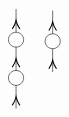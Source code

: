 \begin{equation}
\begin{tikzpicture}[x=0.55pt,y=0.55pt,yscale=-1,xscale=1]
\draw    (220.5,57.72) -- (220.5,27.4) ;
\draw [shift={(220.5,42.56)}, rotate = 450] [color={rgb, 255:red, 0; green, 0; blue, 0 }  ][line width=0.75]    (10.93,-4.9) .. controls (6.95,-2.3) and (3.31,-0.67) .. (0,0) .. controls (3.31,0.67) and (6.95,2.3) .. (10.93,4.9)   ;
\draw   (210.75,67.4) .. controls (210.75,62.05) and (215.12,57.72) .. (220.5,57.72) .. controls (225.88,57.72) and (230.25,62.05) .. (230.25,67.4) .. controls (230.25,72.75) and (225.88,77.08) .. (220.5,77.08) .. controls (215.12,77.08) and (210.75,72.75) .. (210.75,67.4) -- cycle ;
\draw    (220.5,107.4) -- (220.5,77.08) ;
\draw [shift={(220.5,92.24)}, rotate = 450] [color={rgb, 255:red, 0; green, 0; blue, 0 }  ][line width=0.75]    (10.93,-4.9) .. controls (6.95,-2.3) and (3.31,-0.67) .. (0,0) .. controls (3.31,0.67) and (6.95,2.3) .. (10.93,4.9)   ;

\draw   (210.75,117.08) .. controls (210.75,111.74) and (215.12,107.4) .. (220.5,107.4) .. controls (225.88,107.4) and (230.25,111.74) .. (230.25,117.08) .. controls (230.25,122.43) and (225.88,126.77) .. (220.5,126.77) .. controls (215.12,126.77) and (210.75,122.43) .. (210.75,117.08) -- cycle ;
\draw    (220.5,157.08) -- (220.5,126.77) ;
\draw [shift={(220.5,141.93)}, rotate = 450] [color={rgb, 255:red, 0; green, 0; blue, 0 }  ][line width=0.75]    (10.93,-4.9) .. controls (6.95,-2.3) and (3.31,-0.67) .. (0,0) .. controls (3.31,0.67) and (6.95,2.3) .. (10.93,4.9)   ;
\draw    (267.5,59.72) -- (267.5,29.4) ;
\draw [shift={(267.5,44.56)}, rotate = 450] [color={rgb, 255:red, 0; green, 0; blue, 0 }  ][line width=0.75]    (10.93,-4.9) .. controls (6.95,-2.3) and (3.31,-0.67) .. (0,0) .. controls (3.31,0.67) and (6.95,2.3) .. (10.93,4.9)   ;
\draw   (257.75,69.4) .. controls (257.75,64.05) and (262.12,59.72) .. (267.5,59.72) .. controls (272.88,59.72) and (277.25,64.05) .. (277.25,69.4) .. controls (277.25,74.75) and (272.88,79.08) .. (267.5,79.08) .. controls (262.12,79.08) and (257.75,74.75) .. (257.75,69.4) -- cycle ;
\draw    (267.5,109.4) -- (267.5,79.08) ;
\draw [shift={(267.5,94.24)}, rotate = 450] [color={rgb, 255:red, 0; green, 0; blue, 0 }  ][line width=0.75]    (10.93,-4.9) .. controls (6.95,-2.3) and (3.31,-0.67) .. (0,0) .. controls (3.31,0.67) and (6.95,2.3) .. (10.93,4.9)   ;


\end{tikzpicture}
\end{equation}
